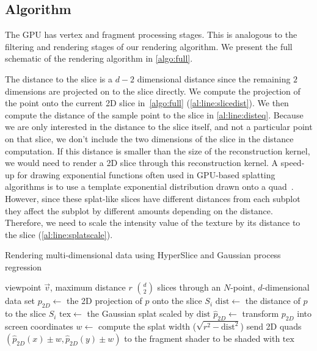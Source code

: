 \subsection{Algorithm}

The GPU has vertex and fragment processing stages.  This is analogous
to the filtering and rendering stages of our rendering algorithm.
We present the full schematic of the rendering algorithm in \autoref{algo:full}.

The distance to the slice is a $d-2$ dimensional distance since the remaining
$2$ dimensions are projected on to the slice directly.
We compute the projection of the point onto the current 2D 
slice in~\autoref{algo:full} (\autoref{al:line:slicedist}).
We then compute the distance of the sample point to the slice in 
\autoref{al:line:disteq}.
Because we are only interested in the distance to the slice itself, and not
a particular point on that slice, we don't include the two dimensions
of the slice in the distance computation.  
If this distance is smaller
than the size of the reconstruction kernel, we would need to render a
2D slice through this reconstruction kernel. 
A speed-up for drawing exponential functions often used
in GPU-based splatting algorithms is to use a template exponential distribution
drawn onto a quad~\cite{Mueller:1998}.
However, since these splat-like slices have different distances from each subplot they affect
the subplot by different amounts depending on the distance.  Therefore, we 
need to scale the intensity
value of the texture by its distance to the 
slice (\autoref{al:line:splatscale}).

\begin{algorithm}
  \caption{Rendering multi-dimensional data using HyperSlice and Gaussian process regression}
  \label{algo:full}
  \begin{algorithmic}
  \Require viewpoint $\vec{v}$, maximum distance $r$
  \Ensure ${d \choose 2}$ slices through an $N$-point, $d$-dimensional data set
   
      \State $p_{2D} \gets$ the 2D projection of $p$ onto the slice $S_i$\label{al:line:slicedist}\;
      \State $\mathrm{dist} \gets$ the distance of $p$ to the slice $S_i$\label{al:line:disteq}\;
        \label{al:line:filterif}
        \State $\mathrm{tex} \gets$ the Gaussian splat scaled by $\mathrm{dist}$\label{al:line:splatscale}\;
        \State $\hat{p}_{2D} \gets$ transform $p_{2D}$ into screen coordinates\label{al:line:screenpoint}\;
        \State $w \gets$ compute the splat width ($\sqrt{r^2-\mathrm{dist}^2}$)\label{al:line:splatsize}\;
        \State send 2D quads $(\hat{p}_{2D}(x) \pm w, \hat{p}_{2D}(y) \pm w)$ to the 
          fragment shader to be shaded with $\mathrm{tex}$\;
      \EndIf
    \EndFor
  \EndFor
  \end{algorithmic}
\end{algorithm}

